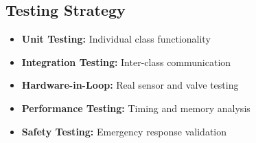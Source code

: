\subsection{Testing Strategy}
\begin{itemize}
    \item \textbf{Unit Testing:} Individual class functionality
    \item \textbf{Integration Testing:} Inter-class communication
    \item \textbf{Hardware-in-Loop:} Real sensor and valve testing
    \item \textbf{Performance Testing:} Timing and memory analysis
    \item \textbf{Safety Testing:} Emergency response validation
\end{itemize}
